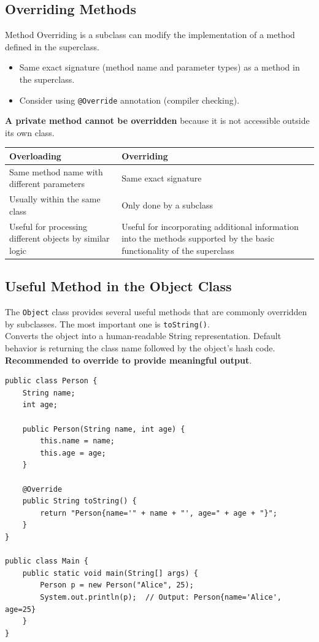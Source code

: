 \documentclass[letterpaper,12pt]{article}
\begin{document}
\subsection{Overriding Methods}
Method Overriding is a subclass can modify the implementation of a method defined in the superclass.
\begin{itemize}
    \item Same exact signature (method name and parameter types) as a method in the superclass.
    \item Consider using \texttt{@Override} annotation (compiler checking).
\end{itemize}
\textbf{A private method cannot be overridden} because it is not accessible outside its own class.
\begin{center}
    \renewcommand{\arraystretch}{1.5}
    \setlength{\tabcolsep}{3pt}
    \small
    \begin{tabular}{|p{5cm}|p{5cm}|}
        \hline
        \textbf{Overloading} & \textbf{Overriding}\\
        \hline
        Same method name with different parameters & Same exact signature\\
        \hline
        Usually within the same class & Only done by a subclass \\
        \hline
        Useful for processing different objects by similar logic & Useful for incorporating additional information into the methods supported by the basic functionality of the superclass \\
        \hline
    \end{tabular}
\end{center}

\subsection{Useful Method in the Object Class}
The \texttt{Object} class provides several useful methods that are commonly overridden by subclasses. The most important one is \texttt{toString()}.\\
Converts the object into a human-readable String representation. Default behavior is returning the class name followed by the object's hash code. \textbf{Recommended to override to provide meaningful output}.
\begin{verbatim}
public class Person {
    String name;
    int age;

    public Person(String name, int age) {
        this.name = name;
        this.age = age;
    }

    @Override
    public String toString() {
        return "Person{name='" + name + "', age=" + age + "}";
    }
}

public class Main {
    public static void main(String[] args) {
        Person p = new Person("Alice", 25);
        System.out.println(p);  // Output: Person{name='Alice', age=25}
    }
}
\end{verbatim}
\end{document}
